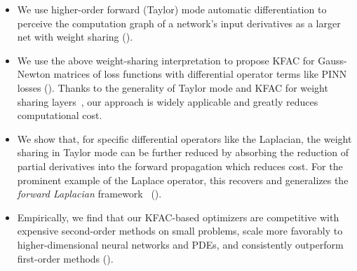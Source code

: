 \begin{itemize}
\item We use higher-order forward (Taylor) mode automatic differentiation to perceive the computation graph of a network's input derivatives as a larger net with weight sharing ().

\item We use the above weight-sharing interpretation to propose KFAC for Gauss-Newton matrices of loss functions with differential operator terms like PINN losses ().
  Thanks to the generality of Taylor mode and KFAC for weight sharing layers~\cite{eschenhagen2023kroneckerfactored}, our approach is widely applicable and greatly reduces computational cost.

\item We show that, for specific differential operators like the Laplacian, the weight sharing in Taylor mode can be further reduced by absorbing the reduction of partial derivatives into the forward propagation which reduces cost.
  For the prominent example of the Laplace operator, this recovers and generalizes the \emph{forward Laplacian} framework~\cite{li2023forward} ().

\item Empirically, we find that our KFAC-based optimizers are competitive with expensive second-order methods on small problems, scale more favorably to higher-dimensional neural networks and PDEs, and consistently outperform first-order methods ().
\end{itemize}

